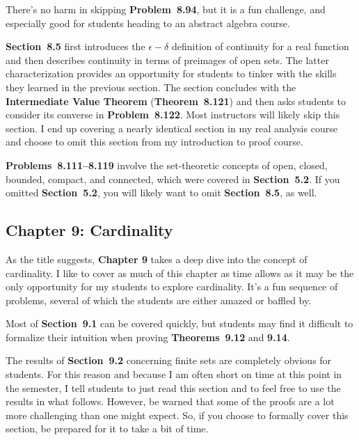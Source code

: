 \documentclass[11pt]{article}%
\newcommand{\blankline}{\pagebreak[2]\vspace{.5\baselineskip}}
\begin{document}
\blankline

There's no harm in skipping \textbf{Problem~8.94}, but it is a fun challenge, and especially good for students heading to an abstract algebra course.

\blankline

\textbf{Section~8.5} first introduces the $\epsilon-\delta$ definition of continuity for a real function and then describes continuity in terms of preimages of open sets. The latter characterization provides an opportunity for students to tinker with the skills they learned in the previous section. The section concludes with the \textbf{Intermediate Value Theorem} (\textbf{Theorem~8.121}) and then asks students to consider its converse in \textbf{Problem~8.122}. Most instructors will likely skip this section. I end up covering a nearly identical section in my real analysis course and choose to omit this section from my introduction to proof course.

\blankline

\textbf{Problems~8.111--8.119} involve the set-theoretic concepts of open, closed, bounded, compact, and connected, which were covered in \textbf{Section~5.2}.  If you omitted \textbf{Section~5.2}, you will likely want to omit \textbf{Section~8.5}, as well.


\subsection*{Chapter 9: Cardinality}


As the title suggests, \textbf{Chapter 9} takes a deep dive into the concept of cardinality.  I like to cover as much of this chapter as time allows as it may be the only opportunity for my students to explore cardinality.  It's a fun sequence of problems, several of which the students are either amazed or baffled by.  

\blankline

Most of \textbf{Section~9.1} can be covered quickly, but students may find it difficult to formalize their intuition when proving \textbf{Theorems~9.12} and \textbf{9.14}.

\blankline

The results of \textbf{Section~9.2} concerning finite sets are completely obvious for students.  For this reason and because I am often short on time at this point in the semester, I tell students to just read this section and to feel free to use the results in what follows.  However, be warned that some of the proofs are a lot more challenging than one might expect.  So, if you choose to formally cover this section, be prepared for it to take a bit of time.  
\end{document}

